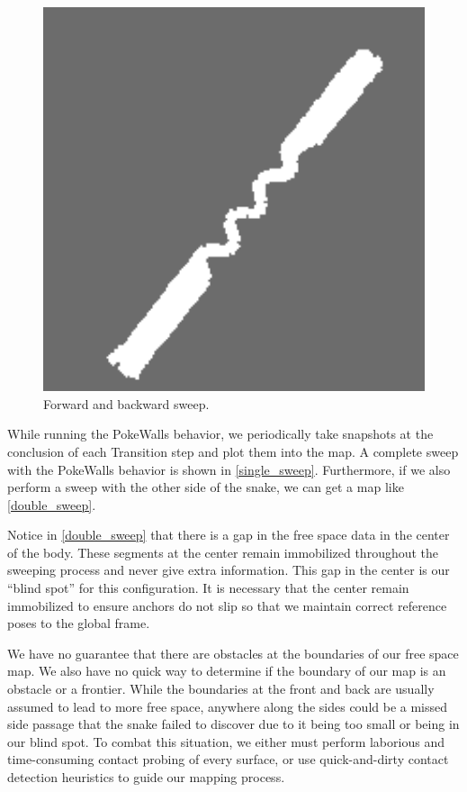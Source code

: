\begin{figure}[htbp]
\centering
\includegraphics[keepaspectratio,width=400pt,height=0.75\textheight]{localOccDouble.png}
\caption{Forward and backward sweep.}
\label{double_sweep}
\end{figure}




While running the PokeWalls behavior, we periodically take snapshots at the conclusion of each Transition step and plot them into the map. A complete sweep with the PokeWalls behavior is shown in \autoref{single_sweep}. Furthermore, if we also perform a sweep with the other side of the snake, we can get a map like \autoref{double_sweep}.

Notice in \autoref{double_sweep} that there is a gap in the free space data in the center of the body. These segments at the center remain immobilized throughout the sweeping process and never give extra information. This gap in the center is our ``blind spot'' for this configuration. It is necessary that the center remain immobilized to ensure anchors do not slip so that we maintain correct reference poses to the global frame.

We have no guarantee that there are obstacles at the boundaries of our free space map. We also have no quick way to determine if the boundary of our map is an obstacle or a frontier. While the boundaries at the front and back are usually assumed to lead to more free space, anywhere along the sides could be a missed side passage that the snake failed to discover due to it being too small or being in our blind spot. To combat this situation, we either must perform laborious and time-consuming contact probing of every surface, or use quick-and-dirty contact detection heuristics to guide our mapping process.

